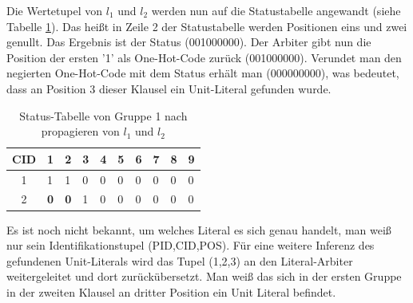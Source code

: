 Die Wertetupel von $l_1$ und $l_2$ werden nun auf die Statustabelle
angewandt (siehe Tabelle \ref{bsp_literal_lookup4}).
Das heißt in Zeile 2 der Statustabelle werden Positionen eins und zwei genullt.
Das Ergebnis ist der Status (001000000). Der Arbiter gibt nun die Position
der ersten '1' als One-Hot-Code zurück (001000000). Verundet man den negierten 
One-Hot-Code mit dem Status erhält man (000000000), was bedeutet, dass
an Position 3 dieser Klausel ein Unit-Literal gefunden wurde.
\begin{table}[h]
  \centering
  \begin{tabular}{|c|l|l|l|l|l|l|l|l|l|}
    \hline
    \textsc{CID} & \textsc{1} & \textsc{2} & \textsc{3}& \textsc{4}& \textsc{5}& \textsc{6}& \textsc{7}& \textsc{8}& \textsc{9}\\
    \hline
    \hline
    1 & 1& 1& 0& 0& 0& 0& 0& 0& 0 \\
    \hline
    2 & \textbf{0}& \textbf{0}& 1& 0& 0& 0& 0& 0& 0 \\
    \hline
  \end{tabular}
  \caption{Status-Tabelle von Gruppe 1 nach propagieren von $l_1$ und $l_2$}
  \label{bsp_literal_lookup4}
\end{table}
Es ist noch nicht bekannt, um welches Literal es sich genau
handelt, man weiß nur sein Identifikationstupel (PID,CID,POS).
Für eine weitere Inferenz des gefundenen Unit-Literals
wird das Tupel (1,2,3) an den Literal-Arbiter weitergeleitet
und dort zurückübersetzt. Man weiß das sich in
der ersten Gruppe in der zweiten Klausel an dritter Position
ein Unit Literal befindet.

